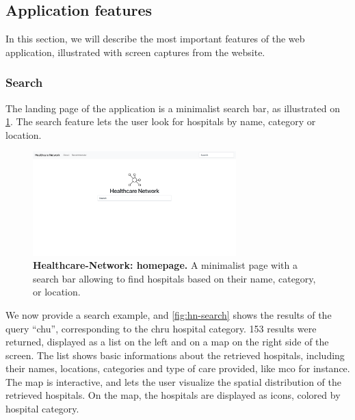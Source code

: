 \subsection{Application features}

In this section, we will describe the most important features of the web application, illustrated with screen captures from the website.

\subsubsection{Search}

The landing page of the application is a minimalist search bar, as illustrated on \cref{fig:hn-home}. The search feature lets the user look for hospitals by name, category or location.

\begin{figure}[H]
    \includegraphics[width=0.7\textwidth]{images/healthcare-network/home.png}
    \centering
    \caption{
        \textbf{Healthcare-Network: homepage.} A minimalist page with a search bar allowing to find hospitals based on their name, category, or location.
    }
    \label{fig:hn-home}
\end{figure}

We now provide a search example, and \cref{fig:hn-search} shows the results of the query ``chu'', corresponding to the \acf{chru} hospital category. 153 results were returned, displayed as a list on the left and on a map on the right side of the screen. The list shows basic informations about the retrieved hospitals, including their names, locations, categories and type of care provided, like \acf{mco} for instance. The map is interactive, and lets the user visualize the spatial distribution of the retrieved hospitals. On the map, the hospitals are displayed as icons, colored by hospital category.

